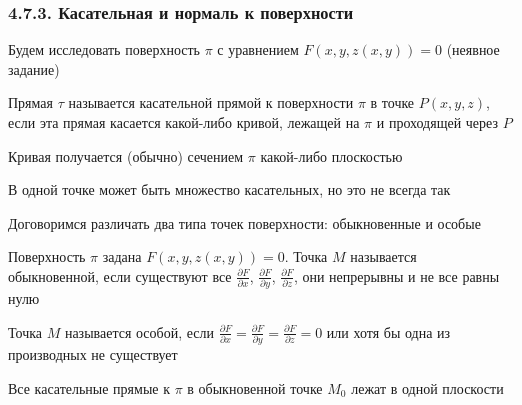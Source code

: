 \documentclass[12pt]{article}
\begin{document}
    \hypertarget{tangentandnormaltosurface}{}

    \subsubsection{4.7.3. Касательная и нормаль к поверхности}

    Будем исследовать поверхность $\pi$ с уравнением $F(x, y, z(x, y)) = 0$ (неявное задание)

    \hypertarget{tangenttosurface}{}

    \Def Прямая $\tau$ называется касательной прямой к поверхности $\pi$ в точке $P(x, y, z)$,
    если эта прямая касается какой-либо кривой, лежащей на $\pi$ и проходящей через $P$

    \Notas Кривая получается (обычно) сечением $\pi$ какой-либо плоскостью

    \Notas В одной точке может быть множество касательных, но это не всегда так

    \Nota Договоримся различать два типа точек поверхности: обыкновенные и особые

    \Def Поверхность $\pi$ задана $F(x, y, z(x, y)) = 0$. Точка $M$ называется обыкновенной, если существуют
    все $\frac{\partial F}{\partial x}$, $\frac{\partial F}{\partial y}$, $\frac{\partial F}{\partial z}$,
    они непрерывны и не все равны нулю

    \Defs Точка $M$ называется особой, если $\frac{\partial F}{\partial x} = \frac{\partial F}{\partial y} = \frac{\partial F}{\partial z} = 0$
    или хотя бы одна из производных не существует

    \begin{MyTheorem}
        \Ths Все касательные прямые к $\pi$ в обыкновенной точке $M_0$ лежат в одной плоскости
    \end{MyTheorem}
\end{document}
